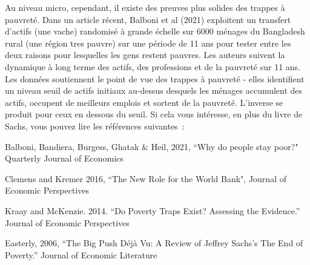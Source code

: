 \documentclass[11pt,a4paper]{article}
\begin{document}
Au niveau micro, cependant, il existe des preuves plus solides des trappes à pauvreté. Dans un article récent, Balboni et al (2021) exploitent un transfert d'actifs (une vache) randomisé à grande échelle  sur 6000 ménages du Bangladesh rural (une région tres pauvre) sur une période de 11 ans pour tester entre les deux raisons pour lesquelles les gens restent pauvres. Les auteurs suivent la dynamique à long terme des actifs, des professions et de la pauvreté
sur 11 ans. Les données soutiennent le point de vue des trappes à pauvreté - elles identifient un niveau seuil de
actifs initiaux au-dessus desquels les ménages accumulent des actifs, occupent de meilleurs emplois et 
sortent de la pauvreté. L'inverse se produit pour ceux en dessous du seuil. Si cela vous intéresse, en plus du livre de Sachs, vous pouvez lire les références suivantes :
\bigskip

\footnotesize{ Balboni,  Bandiera,  Burgess,  Ghatak &  Heil, 2021, “Why do people stay poor?" Quarterly Journal of Economics

\medskip
Clemens and Kremer 2016, “The New Role for the World Bank", Journal of Economic Perspectives 

\medskip
Kraay and McKenzie. 2014. “Do
Poverty Traps Exist? Assessing the Evidence.” Journal of Economic Perspectives 

\medskip
Easterly, 2006, “The Big Push Déjà Vu: A Review of Jeffrey Sachs's The End of Poverty.” Journal of Economic Literature}
\end{document}

